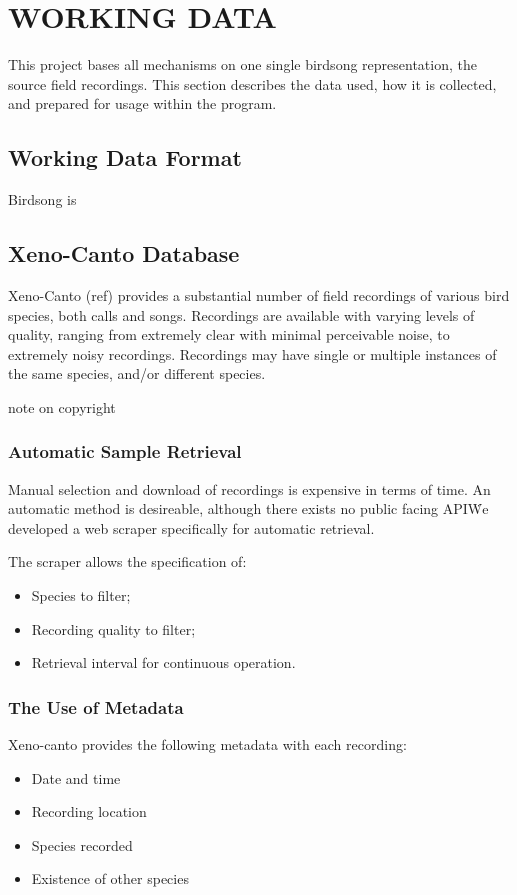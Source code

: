 \chapter{WORKING DATA}
This project bases all mechanisms on one single birdsong representation, the
source field recordings.
This section describes the data used, how it is collected, and prepared for
usage within the program.

\section{Working Data Format}
Birdsong is 

\section{Xeno-Canto Database}
Xeno-Canto (ref) provides a substantial number of field recordings of various
bird species, both calls and songs.
Recordings are available with varying levels of quality, ranging from extremely
clear with minimal perceivable noise, to extremely noisy recordings.
Recordings may have single or multiple instances of the same species, and/or
different species.

note on copyright

\subsection{Automatic Sample Retrieval}
Manual selection and download of recordings is expensive in terms of time.
An automatic method is desireable, although there exists no public facing API\.
We developed a web scraper specifically for automatic retrieval.

The scraper allows the specification of:
\begin{itemize}
  \item Species to filter;
  \item Recording quality to filter;
  \item Retrieval interval for continuous operation.
\end{itemize}

\subsection{The Use of Metadata}
Xeno-canto provides the following metadata with each recording:
\begin{itemize}
  \item Date and time
  \item Recording location
  \item Species recorded
  \item Existence of other species
\end{itemize}

